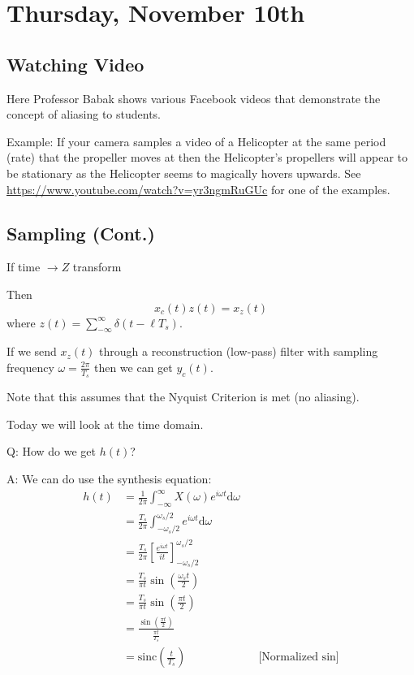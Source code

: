 \section{Thursday, November 10th}
\subsection{Watching Video}
Here Professor Babak shows various Facebook videos that demonstrate the concept of aliasing to students.

Example: If your camera samples a video of a Helicopter at the same period (rate) that the propeller moves at then the Helicopter's propellers will appear to be stationary as the Helicopter seems to magically hovers upwards. See \href{https://www.youtube.com/watch?v=yr3ngmRuGUc}{https://www.youtube.com/watch?v=yr3ngmRuGUc} for one of the examples.

\subsection{Sampling (Cont.)}
If time $\to Z$ transform

Then 
\[
    x_c(t) z(t) = x_z(t)
\]
where $z(t)=\sum_{-\infty}^\infty \delta(t-\ell T_s)$.

If we send $x_z(t)$ through a reconstruction (low-pass) filter with sampling frequency $\omega=\frac{2\pi}{T_s}$ then we can get $y_c(t)$.

Note that this assumes that the Nyquist Criterion is met (no aliasing).

Today we will look at the time domain.
\begin{shaded}
Q: How do we get $h(t)$?
\end{shaded}
A: We can do use the synthesis equation:
\begin{align*}
    h(t)
    &=\frac1{2\pi}\int_{-\infty}^\infty X(\omega) e^{i\omega t} \mathrm d \omega
    \\
    &=\frac{T_s}{2\pi}\int_{-\omega_s/2}^{\omega_s/2} e^{i\omega t} \mathrm d \omega
    \\
    &=\frac{T_s}{2\pi}
    \left[
    \frac{e^{i\omega t}}{it}
    \right]_{-\omega_s/2}^{\omega_s/2}
    \\
    &=\frac{T_s}{\pi t}
    \sin\left(\frac{\omega_s t}{2}\right)
    \\
    &=\frac{T_s}{\pi t}
    \sin\left(\frac{\pi t}{2}\right)
    \\
    &=\frac{\sin\left(\frac{\pi t}{2}\right)}{\frac{\pi t}{T_s}}
    \\
    &=\text{sinc}\left(\frac t{T_s}\right)
    &&\text{[Normalized $\sin$]}
\end{align*}

